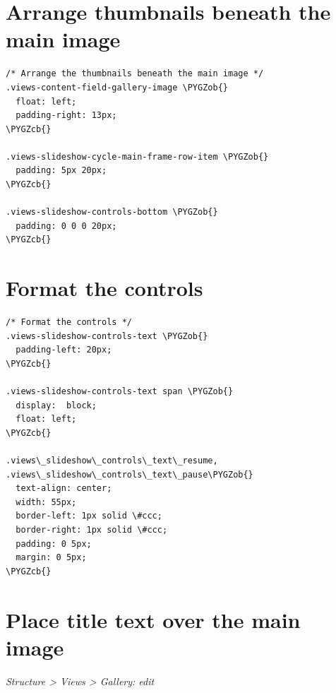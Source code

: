 \documentclass[letterpaper,10pt,english]{sphinxmanual}
\def\PYGZob{\char`\{}
\def\PYGZcb{\char`\}}
\begin{document}
\section{Arrange thumbnails beneath the main image}
\label{slideshows:arrange-thumbnails-beneath-the-main-image}
\begin{Verbatim}[commandchars=\\\{\}]
/* Arrange the thumbnails beneath the main image */
.views-content-field-gallery-image \PYGZob{}
  float: left;
  padding-right: 13px;
\PYGZcb{}

.views-slideshow-cycle-main-frame-row-item \PYGZob{}
  padding: 5px 20px;
\PYGZcb{}

.views-slideshow-controls-bottom \PYGZob{}
  padding: 0 0 0 20px;
\PYGZcb{}
\end{Verbatim}


\section{Format the controls}
\label{slideshows:format-the-controls}
\begin{Verbatim}[commandchars=\\\{\}]
/* Format the controls */
.views-slideshow-controls-text \PYGZob{}
  padding-left: 20px;
\PYGZcb{}

.views-slideshow-controls-text span \PYGZob{}
  display:  block;
  float: left;
\PYGZcb{}

.views\_slideshow\_controls\_text\_resume,
.views\_slideshow\_controls\_text\_pause\PYGZob{}
  text-align: center;
  width: 55px;
  border-left: 1px solid \#ccc;
  border-right: 1px solid \#ccc;
  padding: 0 5px;
  margin: 0 5px;
\PYGZcb{}
\end{Verbatim}


\section{Place title text over the main image}
\label{slideshows:place-title-text-over-the-main-image}
\emph{Structure \textgreater{} Views \textgreater{} Gallery: edit}
\end{document}
